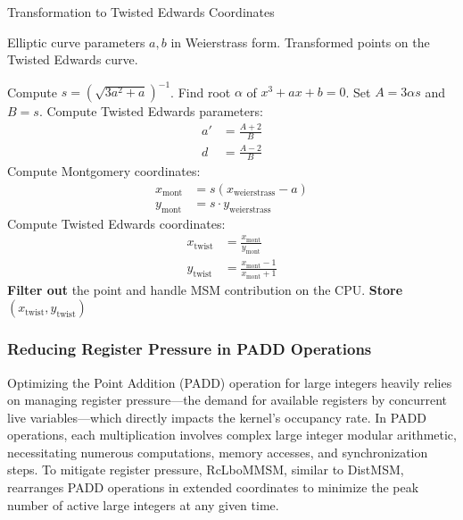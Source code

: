 \documentclass[journal=tches,final]{iacrtrans}
\begin{document}
\begin{algorithm}[H]
\caption{Transformation to Twisted Edwards Coordinates}
\label{alg:twisted_edwards_transformation}
\begin{algorithmic}[1]
\REQUIRE Elliptic curve parameters \( a, b \) in Weierstrass form.
\ENSURE Transformed points on the Twisted Edwards curve.

\STATE Compute \( s = (\sqrt{3 a^2 + a})^{-1} \).
\STATE Find root \( \alpha \) of \( x^3 + a x + b = 0 \).
\STATE Set \( A = 3 \alpha s \) and \( B = s \).
\STATE Compute Twisted Edwards parameters:
\begin{align*}
a' &= \frac{A + 2}{B} \\
d &= \frac{A - 2}{B}
\end{align*}
    \STATE Compute Montgomery coordinates:
    \begin{align*}
    x_{\text{mont}} &= s (x_{\text{weierstrass}} - a) \\
    y_{\text{mont}} &= s \cdot y_{\text{weierstrass}}
    \end{align*}
    \STATE Compute Twisted Edwards coordinates:
    \begin{align*}
    x_{\text{twist}} &= \frac{x_{\text{mont}}}{y_{\text{mont}}} \\
    y_{\text{twist}} &= \frac{x_{\text{mont}} - 1}{x_{\text{mont}} + 1}
    \end{align*}
        \STATE \textbf{Filter out} the point and handle MSM contribution on the CPU.
    \ENDIF
    \STATE \textbf{Store} \( (x_{\text{twist}}, y_{\text{twist}}) \)
\ENDFOR
\end{algorithmic}
\end{algorithm}

\subsubsection{\textbf{Reducing Register Pressure in PADD Operations}}
Optimizing the Point Addition (PADD) operation for large integers heavily relies on managing register pressure—the demand for available registers by concurrent live variables—which directly impacts the kernel's occupancy rate. In PADD operations, each multiplication involves complex large integer modular arithmetic, necessitating numerous computations, memory accesses, and synchronization steps. To mitigate register pressure, RcLboMMSM, similar to DistMSM, rearranges PADD operations in extended coordinates to minimize the peak number of active large integers at any given time.
\end{document}
